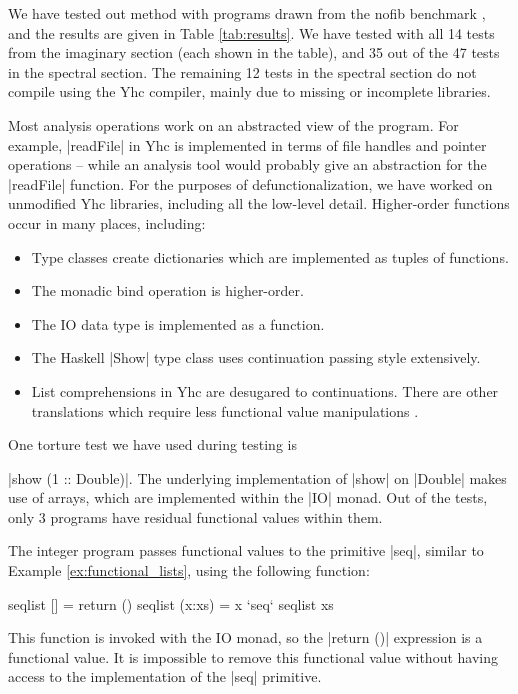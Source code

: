 \documentclass[preprint]{sigplanconf}
\begin{document}
We have tested out method with programs drawn from the nofib benchmark \cite{nofib}, and the results are given in Table \ref{tab:results}. We have tested with all 14 tests from the imaginary section (each shown in the table), and 35 out of the 47 tests in the spectral section. The remaining 12 tests in the spectral section do not compile using the Yhc compiler, mainly due to missing or incomplete libraries.

Most analysis operations work on an abstracted view of the program. For example, |readFile| in Yhc is implemented in terms of file handles and pointer operations -- while an analysis tool would probably give an abstraction for the |readFile| function. For the purposes of defunctionalization, we have worked on unmodified Yhc libraries, including all the low-level detail. Higher-order functions occur in many places, including:

\begin{itemize}
\item Type classes create dictionaries which are implemented as tuples of functions.
\item The monadic bind operation is higher-order.
\item The IO data type is implemented as a function.
\item The Haskell |Show| type class uses continuation passing style extensively.
\item List comprehensions in Yhc are desugared to continuations. There are other translations which require less functional value manipulations \cite{wadler:list_comprehensions,coutts:stream_fusion}.
\end{itemize}

One torture test we have used during testing is \ignore|show (1 :: Double)|. The underlying implementation of |show| on |Double| makes use of arrays, which are implemented within the |IO| monad. Out of the tests, only 3 programs have residual functional values within them.

The integer program passes functional values to the primitive |seq|, similar to Example \ref{ex:functional_lists}, using the following function:

\begin{code}
seqlist [] = return ()
seqlist (x:xs) = x `seq` seqlist xs
\end{code}

This function is invoked with the IO monad, so the |return ()| expression is a functional value. It is impossible to remove this functional value without having access to the implementation of the |seq| primitive.
\end{document}
